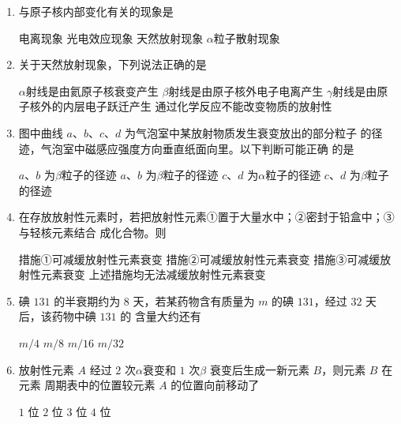 \begin{enumerate}
\item 
{}
与原子核内部变化有关的现象是  


\fourchoices
{电离现象}
{光电效应现象}
{天然放射现象}
{$ \alpha $粒子散射现象}



\item 
{}
关于天然放射现象，下列说法正确的是  

\fourchoices
{$ \alpha $射线是由氦原子核衰变产生}
{$ \beta $射线是由原子核外电子电离产生}
{$ \gamma $射线是由原子核外的内层电子跃迁产生}
{通过化学反应不能改变物质的放射性}



\item 
{}
图中曲线 $ a $、$ b $、$ c $、$ d $ 为气泡室中某放射物质发生衰变放出的部分粒子
的径迹，气泡室中磁感应强度方向垂直纸面向里。以下判断可能正确
的是  
\begin{figure}[h!]
	\centering
	
\end{figure}


\fourchoices
{$ a $、$ b $ 为$ \beta $粒子的径迹}
{$ a $、$ b $ 为$ \beta $粒子的径迹}
{$ c $、$ d $ 为$ \alpha $粒子的径迹}
{$ c $、$ d $ 为$ \beta $粒子的径迹}




\item 
{}
在存放放射性元素时，若把放射性元素①置于大量水中；②密封于铅盒中；③与轻核元素结合
成化合物。则  


\fourchoices
{措施①可减缓放射性元素衰变}
{措施②可减缓放射性元素衰变}
{措施③可减缓放射性元素衰变}
{上述措施均无法减缓放射性元素衰变}



\item
{}
碘 $ 131 $ 的半衰期约为 $ 8 $ 天，若某药物含有质量为 $ m $ 的碘 $ 131 $，经过 $ 32 $ 天后，该药物中碘 $ 131 $ 的
含量大约还有  

\fourchoices
{$ m/4 $}
{$ m/8 $}
{$ m/16 $}
{$ m/32 $}



\item 
{}
放射性元素 $ A $ 经过 $ 2 $ 次$ \alpha $衰变和 $ 1 $ 次$ \beta $ 衰变后生成一新元素 $ B $，则元素 $ B $ 在元素
周期表中的位置较元素 $ A $ 的位置向前移动了  

\fourchoices
{$ 1 $ 位}
{$ 2 $ 位}
{$ 3 $ 位}
{$ 4 $ 位}



\end{enumerate}
